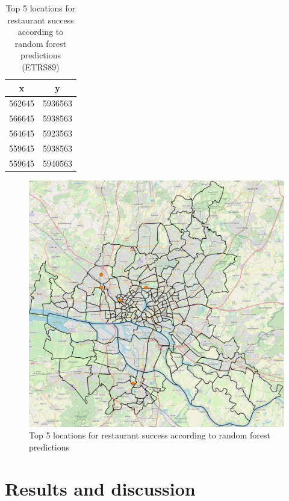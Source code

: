 \documentclass[a4paper, 11pt, oneside]{Thesis}  %
\begin{document}
\begin{table}[h!]
\begin{center}
\begin{tabular}{| c | c |}
\hline
x & y \\
 \hline
 562645 & 5936563 \\ 
 566645 & 5938563 \\  
 564645 & 5923563 \\    
 559645 & 5938563 \\
 559645 & 5940563 \\
 \hline
\end{tabular}

\caption{Top 5 locations for restaurant success according to random forest predictions (ETRS89)}
\label{table:top_five_locations}
\end{center}
\end{table}

\begin{figure}[h]
\includegraphics[scale=0.5]{Figures/Recommendation_map/Top_Five_Locations.png}
\centering
\caption{Top 5 locations for restaurant success according to random forest predictions}
\label{fig:Top_Five_Locations}
\end{figure}

\chapter{Results and discussion}
\end{document}

